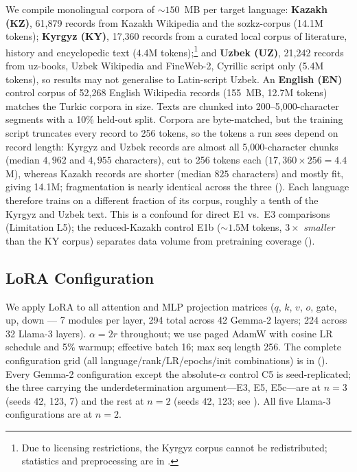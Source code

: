 \documentclass[11pt]{article}
\begin{document}
We compile monolingual corpora of ${\sim}150$~MB per target language: \textbf{Kazakh (KZ)}, 61,879 records from Kazakh Wikipedia and the sozkz-corpus (14.1M tokens); \textbf{Kyrgyz (KY)}, 17,360 records from a curated local corpus of literature, history and encyclopedic text (4.4M tokens);\footnote{Due to licensing restrictions, the Kyrgyz corpus cannot be redistributed; statistics and preprocessing are in .} and \textbf{Uzbek (UZ)}, 21,242 records from uz-books, Uzbek Wikipedia and FineWeb-2, Cyrillic script only (5.4M tokens), so results may not generalise to Latin-script Uzbek. An \textbf{English (EN)} control corpus of 52,268 English Wikipedia records (155~MB, 12.7M tokens) matches the Turkic corpora in size. Texts are chunked into 200--5,000-character segments with a 10\% held-out split. Corpora are byte-matched, but the training script truncates every record to 256 tokens, so the tokens a run sees depend on record length: Kyrgyz and Uzbek records are almost all 5,000-character chunks (median $4{,}962$ and $4{,}955$ characters), cut to 256 tokens each ($17{,}360 \times 256 = 4.4$M), whereas Kazakh records are shorter (median $825$ characters) and mostly fit, giving 14.1M; fragmentation is nearly identical across the three (). Each language therefore trains on a different fraction of its corpus, roughly a tenth of the Kyrgyz and Uzbek text. This is a confound for direct E1 vs.\ E3 comparisons (Limitation L5); the reduced-Kazakh control E1b (${\sim}1.5$M tokens, $3\times$ \emph{smaller} than the KY corpus) separates data volume from pretraining coverage ().

\subsection{LoRA Configuration}

We apply LoRA to all attention and MLP projection matrices ($q$, $k$, $v$, $o$, gate, up, down — 7 modules per layer, 294 total across 42 Gemma-2 layers; 224 across 32 Llama-3 layers). $\alpha = 2r$ throughout; we use paged AdamW with cosine LR schedule and 5\% warmup; effective batch 16; max seq length 256. The complete configuration grid (all language/rank/LR/epochs/init combinations) is in  (). Every Gemma-2 configuration except the absolute-$\alpha$ control C5 is seed-replicated; the three carrying the underdetermination argument---E3, E5, E5c---are at $n{=}3$ (seeds 42, 123, 7) and the rest at $n{=}2$ (seeds 42, 123; see ). All five Llama-3 configurations are at $n{=}2$.
\end{document}
